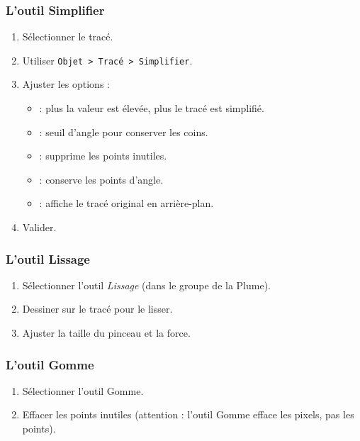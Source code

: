 \subsubsection{L'outil Simplifier}

\begin{enumerate}
    \item Sélectionner le tracé.
    \item Utiliser \texttt{Objet > Tracé > Simplifier}.
    \item Ajuster les options :
    \begin{itemize}
        \item {} : plus la valeur est élevée, plus le tracé est simplifié.
        \item {} : seuil d'angle pour conserver les coins.
        \item {} : supprime les points inutiles.
        \item {} : conserve les points d'angle.
        \item {} : affiche le tracé original en arrière-plan.
    \end{itemize}
    \item Valider.
\end{enumerate}

\subsubsection{L'outil Lissage}

\begin{enumerate}
    \item Sélectionner l'outil \emph{Lissage} (dans le groupe de la Plume).
    \item Dessiner sur le tracé pour le lisser.
    \item Ajuster la taille du pinceau et la force.
\end{enumerate}

\subsubsection{L'outil Gomme}

\begin{enumerate}
    \item Sélectionner l'outil Gomme.
    \item Effacer les points inutiles (attention : l'outil Gomme efface les pixels, pas les points).
\end{enumerate}

